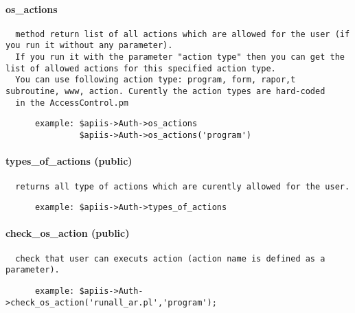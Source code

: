 \paragraph*{os\_actions\label{Apiis::Auth::AppAuth_--_object_for_provading_data_about_user_access_rights_for_the_applications_os_actions}}
\begin{verbatim}
  method return list of all actions which are allowed for the user (if you run it without any parameter).
  If you run it with the parameter "action type" then you can get the list of allowed actions for this specified action type. 
  You can use following action type: program, form, rapor,t subroutine, www, action. Curently the action types are hard-coded 
  in the AccessControl.pm
\end{verbatim}
\begin{verbatim}
      example: $apiis->Auth->os_actions
               $apiis->Auth->os_actions('program')
\end{verbatim}
\paragraph*{types\_of\_actions (public)\label{Apiis::Auth::AppAuth_--_object_for_provading_data_about_user_access_rights_for_the_applications_types_of_actions_public_}}
\begin{verbatim}
  returns all type of actions which are curently allowed for the user.
\end{verbatim}
\begin{verbatim}
      example: $apiis->Auth->types_of_actions
\end{verbatim}
\paragraph*{check\_os\_action (public)\label{Apiis::Auth::AppAuth_--_object_for_provading_data_about_user_access_rights_for_the_applications_check_os_action_public_}}
\begin{verbatim}
  check that user can executs action (action name is defined as a parameter).
\end{verbatim}
\begin{verbatim}
      example: $apiis->Auth->check_os_action('runall_ar.pl','program');
\end{verbatim}
